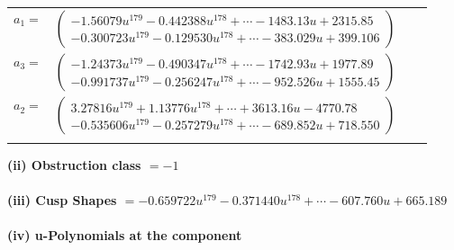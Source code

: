 \documentclass[1p]{elsarticle_modified}
\theoremstyle{definition}
\begin{document}
\begin{tabular}{m{7pt} m{180pt} m{7pt} m{180pt} }
\flushright $a_{1}=$&$\begin{pmatrix}-1.56079 u^{179}-0.442388 u^{178}+\cdots-1483.13 u+2315.85\\-0.300723 u^{179}-0.129530 u^{178}+\cdots-383.029 u+399.106\end{pmatrix}$ \\
\flushright $a_{3}=$&$\begin{pmatrix}-1.24373 u^{179}-0.490347 u^{178}+\cdots-1742.93 u+1977.89\\-0.991737 u^{179}-0.256247 u^{178}+\cdots-952.526 u+1555.45\end{pmatrix}$ \\
\flushright $a_{2}=$&$\begin{pmatrix}3.27816 u^{179}+1.13776 u^{178}+\cdots+3613.16 u-4770.78\\-0.535606 u^{179}-0.257279 u^{178}+\cdots-689.852 u+718.550\end{pmatrix}$\\&\end{tabular}
\flushleft \textbf{(ii) Obstruction class $= -1$}\\~\\
\flushleft \textbf{(iii) Cusp Shapes $= -0.659722 u^{179}-0.371440 u^{178}+\cdots-607.760 u+665.189$}\\~\\
\newpage\renewcommand{\arraystretch}{1}
\flushleft \textbf{(iv) u-Polynomials at the component}\newline \\
\end{document}
